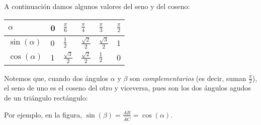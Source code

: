 \documentclass[../teoria.root.tex]{subfiles}
\begin{document}
A continuación damos algunos valores del seno y del coseno:
\begin{center}
    \begin{tabularx}{\textwidth}{|X|X|X|X|X|X|}
        \hline
        \(\alpha\)       & 0 & \(\frac{\pi}{6}\)      & \(\frac{\pi}{4}\)      & \(\frac{\pi}{3}\)      & \(\frac{\pi}{2}\) \\\hline
        \(\sin(\alpha)\) & 0 & \(\frac{1}{2}\)        & \(\frac{\sqrt{2}}{2}\) & \(\frac{\sqrt{3}}{2}\) & 1                 \\\hline
        \(\cos(\alpha)\) & 1 & \(\frac{\sqrt{3}}{2}\) & \(\frac{\sqrt{2}}{2}\) & \(\frac{1}{2}\)        & 0                 \\\hline
    \end{tabularx}
\end{center}
Notemos que, cuando dos ángulos \(\alpha\) y \(\beta\) son \textit{complementarios} (es decir, suman \(\frac{\pi}{2}\)), el seno de uno es el coseno del otro y viceversa, pues son los dos ángulos agudos de un triángulo rectángulo:
\begin{center}
\end{center}
Por ejemplo, en la figura, \(\sin(\beta)=\frac{\overline{AB}}{\overline{AC}}=\cos(\alpha)\).
\end{document}
